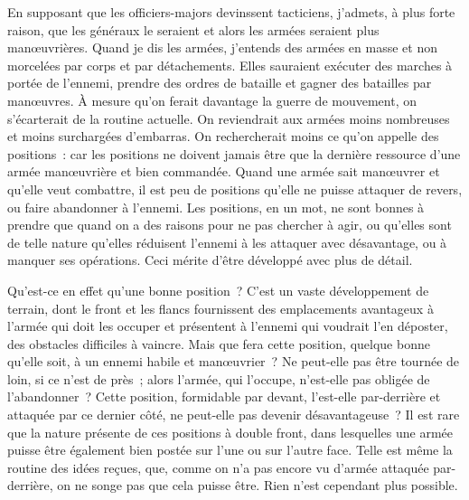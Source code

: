 \documentclass[french,twoside]{book} %
\begin{document}
En supposant que les officiers-majors devinssent tacticiens, j’admets, à plus forte raison, que les généraux le seraient et alors les armées seraient plus manœuvrières. Quand je dis les armées, j’entends des armées en masse et non morcelées par corps et par détachements. Elles sauraient exécuter des marches à portée de l’ennemi, prendre des ordres de bataille et gagner des batailles par manœuvres. À mesure qu’on ferait davantage la guerre de mouvement, on s’écarterait de la routine actuelle. On reviendrait aux armées moins nombreuses et moins surchargées d’embarras. On rechercherait moins ce qu’on appelle des positions : car les positions ne doivent jamais être que la dernière ressource d’une armée manœuvrière et bien commandée. Quand une armée sait manœuvrer et qu’elle veut combattre, il est peu de positions qu’elle ne puisse attaquer de revers, ou faire abandonner à l’ennemi. Les positions, en un mot, ne sont bonnes à prendre que quand on a des raisons pour ne pas chercher à agir, ou qu’elles sont de telle nature qu’elles réduisent l’ennemi à les attaquer avec désavantage, ou à manquer ses opérations. Ceci mérite d’être développé avec plus de détail.\par
Qu’est-ce en effet qu’une bonne position ? C’est un vaste développement de terrain, dont le front et les flancs fournissent des emplacements avantageux à l’armée qui doit les occuper et présentent à l’ennemi qui voudrait l’en déposter, des obstacles difficiles à vaincre. Mais que fera cette position, quelque bonne qu’elle soit, à un ennemi habile et manœuvrier ? Ne peut-elle pas être tournée de loin, si ce n’est de près ; alors l’armée, qui l’occupe, n’est-elle pas obligée de l’abandonner ? Cette position, formidable par devant, l’est-elle par-derrière et attaquée par ce dernier côté, ne peut-elle pas devenir désavantageuse ? Il est rare que la nature présente de ces positions à double front, dans lesquelles une armée puisse être également bien postée sur l’une ou sur l’autre face. Telle est même la routine des idées reçues, que, comme on n’a pas encore vu d’armée attaquée par-derrière, on ne songe pas que cela puisse être. Rien n’est cependant plus possible.\par
\end{document}
